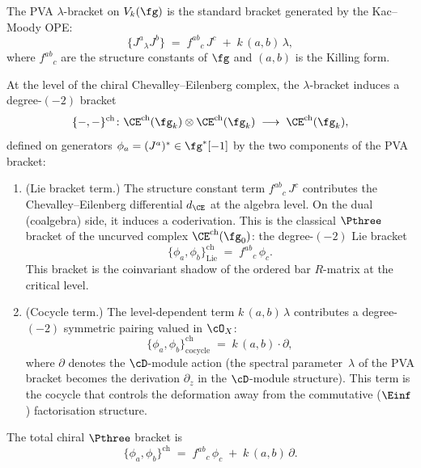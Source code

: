 \begin{construction}
\label{constr:chiral-p3-bracket}
The PVA $\lambda$-bracket on $V_k(\fg)$
is the standard bracket generated by the Kac--Moody OPE:
\begin{equation}\label{eq:pva-bracket-recall}
 \{J^a \mathbin{{}_\lambda} J^b\}
 \;=\;
 f^{ab}{}_c\, J^c \;+\; k\,(a,b)\,\lambda,
\end{equation}
where $f^{ab}{}_c$ are the structure constants of $\fg$ and
$(a,b)$ is the Killing form.

At the level of the chiral Chevalley--Eilenberg complex, the
$\lambda$-bracket induces a degree-$(-2)$ bracket
\begin{equation}\label{eq:chiral-p3-def}
 \{-,-\}^{\mathrm{ch}}
 \colon
 \CE^{\mathrm{ch}}(\fg_k)
 \otimes
 \CE^{\mathrm{ch}}(\fg_k)
 \;\longrightarrow\;
 \CE^{\mathrm{ch}}(\fg_k),
\end{equation}
defined on generators $\phi_a = (J^a)^* \in \fg^*[-1]$ by
the two components of the PVA bracket:
\begin{enumerate}[label=\textup{(\roman*)}]
\item \textup{(Lie bracket term.)}
 The structure constant term $f^{ab}{}_c\,J^c$ contributes
 the Chevalley--Eilenberg differential $d_{\CE}$ at the
 algebra level. On the dual (coalgebra) side, it induces a
 coderivation.
 This is the classical $\Pthree$ bracket of the
 uncurved complex $\CE^{\mathrm{ch}}(\fg_0)$: the degree-$(-2)$
 Lie bracket
 \begin{equation}\label{eq:p3-lie-component}
 \{\phi_a, \phi_b\}^{\mathrm{ch}}_{\mathrm{Lie}}
 \;=\;
 f^{ab}{}_c\,\phi_c.
 \end{equation}
 This bracket is the coinvariant shadow of the ordered bar
 $R$-matrix at the critical level.
\item \textup{(Cocycle term.)}
 The level-dependent term $k\,(a,b)\,\lambda$ contributes a
 degree-$(-2)$ symmetric pairing valued in $\cO_X$:
 \begin{equation}\label{eq:p3-cocycle-component}
 \{\phi_a, \phi_b\}^{\mathrm{ch}}_{\mathrm{cocycle}}
 \;=\;
 k\,(a,b) \cdot \partial,
 \end{equation}
 where $\partial$ denotes the $\cD$-module action
 (the spectral parameter~$\lambda$ of the PVA bracket
 becomes the derivation $\partial_z$ in the $\cD$-module
 structure). This term is the cocycle that controls
 the deformation away from the commutative
 ($\Einf$) factorisation structure.
\end{enumerate}

The total chiral $\Pthree$ bracket is
\begin{equation}\label{eq:chiral-p3-total}
 \{\phi_a, \phi_b\}^{\mathrm{ch}}
 \;=\;
 f^{ab}{}_c\,\phi_c
 \;+\;
 k\,(a,b)\,\partial.
\end{equation}
\end{construction}

